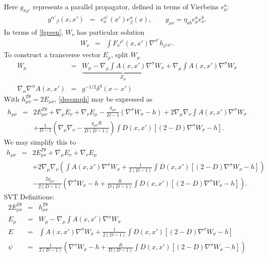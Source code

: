 \documentclass[10pt,letterpaper]{article}
\numberwithin{equation}{section}
\begin{document}
Here $g_{\sigma\rho'}$ represents a parallel propagator, defined in terms of Vierbeins $e_\mu^a$:
\begin{eqnarray}
g^{\alpha'}{}_{\beta}(x,x') &=& e^{\alpha'}_a(x') e_{\beta}^a(x),\qquad g_{\mu\nu} = \eta_{ab}e_{\mu}^ae_\nu^b.
\end{eqnarray}
In terms of \eqref{fgreen}, $W_\nu$ has particular solution
\begin{eqnarray}
W_\nu &=& \int F_\nu{}^{\rho'}(x,x')\nabla^{\sigma'}h_{\rho'\sigma'}.
\end{eqnarray}
To construct a transverse vector $E_{\mu}$, split $W_{\mu}$
\begin{eqnarray}
W_{\mu} &=& \underbrace{W_\mu - \nabla_\mu \int A(x,x')\nabla^\sigma W_\sigma}_{E_\mu} +
\nabla_\mu \int A(x,x')\nabla^\sigma W_\sigma
\nonumber\\
\nabla_\alpha\nabla^\alpha A(x,x') &=& g^{-1/2} \delta^4(x-x')
\end{eqnarray}
With $h_{\mu\nu}^{T\theta} = 2E_{\mu\nu}$, \eqref{decomph} may be expressed as
\begin{eqnarray}
h_{\mu\nu} &=& 2E_{\mu\nu}^{T\theta} + \nabla_\mu E_\nu + \nabla_\nu E_\mu - \frac{g_{\mu\nu}}{D-1}(\nabla^\sigma W_\sigma -h) + 2\nabla_\mu\nabla_\nu \int A(x,x')\nabla^\sigma W_\sigma
\nonumber\\
&&+ \frac{1}{D-1}\left(\nabla_\mu\nabla_\nu - \frac{g_{\mu\nu}R}{D(D-1)}\right)\int D(x,x')\left[(2-D)\nabla^\sigma W_\sigma - h\right].
\end{eqnarray}
We may simplify this to
\begin{eqnarray}
h_{\mu\nu} &=& 2E_{\mu\nu}^{T\theta} + \nabla_\mu E_\nu + \nabla_\nu E_\mu 
\nonumber\\
&&+2\nabla_\mu \nabla_\nu \left( \int A(x,x')\nabla^\sigma W_\sigma + \frac{1}{2(D-1)}\int D(x,x')
[(2-D)\nabla^\sigma W_\sigma -h]\right)
\nonumber\\
&&-\frac{2g_{\mu\nu}}{2(D-1)}\left( \nabla^\sigma W_\sigma -h+ \frac{R}{D(D-1)}\int D(x,x')[(2-D)\nabla^\sigma W_\sigma -h]\right).
\end{eqnarray}
SVT Definitions:
\begin{eqnarray}
2E_{\mu\nu}^{T\theta} &=& h_{\mu\nu}^{T\theta}
\nonumber\\
E_\mu &=& W_\mu - \nabla_\mu\int A(x,x')\nabla^\sigma W_\sigma
\nonumber\\
E &=&  \int A(x,x')\nabla^\sigma W_\sigma + \frac{1}{2(D-1)}\int D(x,x')
[(2-D)\nabla^\sigma W_\sigma -h]
\nonumber\\ 
\psi &=& \frac{1}{2(D-1)}\left( \nabla^\sigma W_\sigma -h + \frac{R}{D(D-1)}\int D(x,x')[(2-D)\nabla^\sigma W_\sigma -h]\right)
\end{eqnarray}
\end{document}
